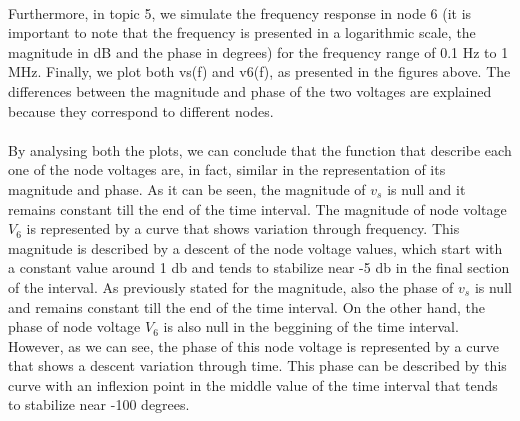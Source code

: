 \paragraph{}
Furthermore, in topic 5, we simulate the frequency response in node 6 (it is important to note that the frequency is presented in a logarithmic scale, the magnitude in dB and the phase in degrees) for the frequency range of 0.1 Hz to 1 MHz. Finally, we plot both vs(f) and v6(f), as presented in the figures above. The differences between the magnitude and phase of the two voltages are explained because they correspond to different nodes.

\paragraph{}
By analysing both the plots, we can conclude that the function that describe each one of the node voltages are, in fact, similar in the representation of its magnitude and phase. As it can be seen, the magnitude of $v_s$ is null and it remains constant till the end of the time interval. The magnitude of node voltage $V_6$ is represented by a curve that shows variation through frequency. This magnitude is described by a descent of the node voltage values, which start with a constant value around 1 db and tends to stabilize near -5 db in the final section of the interval. As previously stated for the magnitude, also the phase of $v_s$ is null and remains constant till the end of the time interval. On the other hand, the phase of node voltage $V_6$ is also null in the beggining of the time interval. However, as we can see, the phase of this node voltage is represented by a curve that shows a descent variation through time. This phase can be described by this curve with an inflexion point in the middle value of the time interval that tends to stabilize near -100 degrees. 


